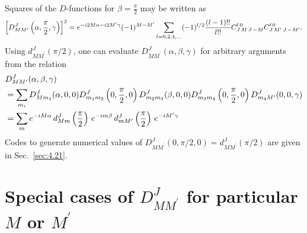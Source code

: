 Squares of the $D$-functions for $\beta=\frac{\pi}{2}$ may be written as
\begin{equation}
\left[D_{M M^{\prime}}^{J}\left(\alpha, \frac{\pi}{2}, \gamma\right)\right]^{2}=e^{-i 2 M \alpha-i 2 M^{\prime} \gamma}(-1)^{M-M^{\prime}} \sum_{l=0,2,4, \ldots}(-1)^{l / 2} \frac{(l-1)!!}{l!!} C_{J\,M\,J\,-M}^{l\,0} C_{J\,M^{\prime}\,J\,-M^{\prime}}^{l\,0} .\label{eq:4:16:9}
\end{equation}
Using $d_{M M^{\prime}}^{J}(\pi / 2)$, one can evaluate $D_{M M^{\prime}}^{J}(\alpha, \beta, \gamma)$ for arbitrary arguments from the relation
\begin{align}
& D_{M M^{\prime}}^{J}(\alpha, \beta, \gamma)  \notag\\
& =\sum_{m_{i}} D_{M m_{1}}^{J}(\alpha, 0,0) D_{m_{1} m_{2}}^{J}\left(0, \frac{\pi}{2}, 0\right) D_{m_{2} m_{3}}^{J}(\beta, 0,0) D_{m_{3} m_{4}}^{J}\left(0, \frac{\pi}{2}, 0\right) D_{m_{4} M^{\prime}}^{J}(0,0, \gamma)  \label{eq:4:16:10}\\
& =\sum_{m} e^{-i M \alpha} \, d_{M m}^{J}\left(\frac{\pi}{2}\right) \, e^{-i m \beta} \, d_{m M^{\prime}}^{J}\left(\frac{\pi}{2}\right) \, e^{-i M^{\prime} \gamma} \notag
\end{align}
Codes to generate numerical values of $D_{M M^{\prime}}^{J}(0, \pi / 2,0)=d_{M M^{\prime}}^{J}(\pi / 2)$ %
are given in Sec.~\ref{sec:4.21}.
\section{Special cases of $D_{M M^{\prime}}^{J}$ for particular $M$ or $M^{\prime}$}\label{sec:4.17}

